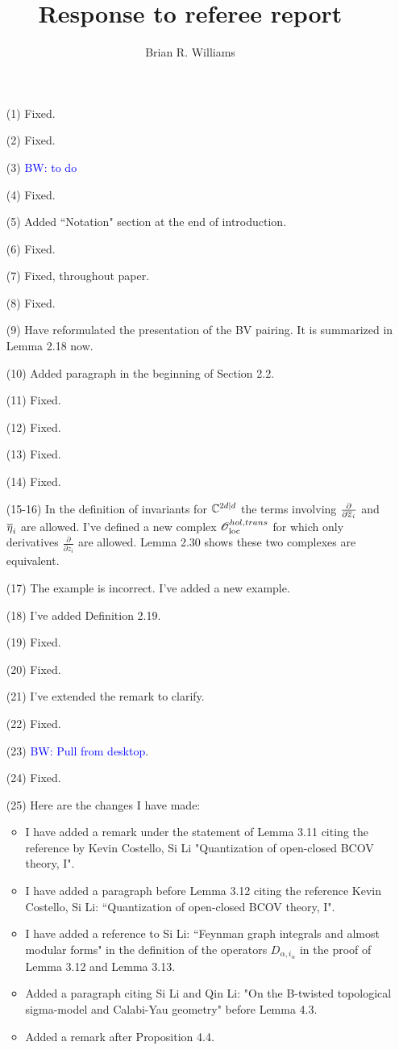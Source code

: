 \documentclass[10pt]{amsart}
\title{Response to referee report}
\author{Brian R. Williams}
\date{}
\def\brian{\textcolor{blue}{BW: }\textcolor{blue}}
\begin{document}
\maketitle

\begin{itemize}
\item[(1)] Fixed.
\item[(2)] Fixed.
\item[(3)] \brian{to do}
\item[(4)] Fixed.
\item[(5)] Added ``Notation" section at the end of introduction. 
\item[(6)] Fixed.
\item[(7)] Fixed, throughout paper. 
\item[(8)] Fixed.
\item[(9)] Have reformulated the presentation of the BV pairing. 
It is summarized in Lemma 2.18 now.
\item[(10)] Added paragraph in the beginning of Section 2.2. 
\item[(11)] Fixed.
\item[(12)] Fixed.
\item[(13)] Fixed.
\item[(14)] Fixed.
\item[(15-16)] In the definition of invariants for $\CC^{2d|d}$ the terms involving $\frac{\partial}{\partial \zbar_i}$ and $\Bar{\eta}_i$ are allowed. 
I've defined a new complex $\sO_{\rm loc}^{hol,trans}$ for which only derivatives $\frac{\partial}{\partial z_i}$ are allowed.
Lemma 2.30 shows these two complexes are equivalent. 
\item[(17)] The example is incorrect. I've added a new example. 
\item[(18)] I've added Definition 2.19. 
\item[(19)] Fixed.
\item[(20)] Fixed.
\item[(21)] I've extended the remark to clarify. 
\item[(22)]Fixed.
\item[(23)] \brian{Pull from desktop}. 
\item[(24)] Fixed.
\item[(25)] Here are the changes I have made:
\begin{itemize}
\item I have added a remark under the statement of Lemma 3.11 citing the reference by Kevin Costello, Si Li "Quantization of open-closed BCOV theory, I". 
\item I have added a paragraph before Lemma 3.12 citing the reference Kevin Costello, Si Li: ``Quantization of open-closed BCOV theory, I".
\item I have added a reference to Si Li: ``Feynman graph integrals and almost modular forms" in the definition of the operators $D_{\alpha,i_\alpha}$ in the proof of Lemma 3.12 and Lemma 3.13. 
\item Added a paragraph citing Si Li and Qin Li: "On the B-twisted topological sigma-model and Calabi-Yau geometry" before Lemma 4.3. 
\item Added a remark after Proposition 4.4. 


\end{itemize}
\end{itemize}
\end{document}
